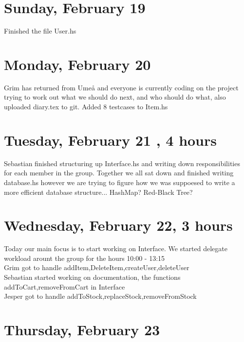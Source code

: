\documentclass[11pt]{article}
\begin{document}
\section*{Sunday, February 19}
Finished the file User.hs
\section*{Monday, February 20}
Grim has returned from Umeå and everyone is currently coding on the project trying to work out what we should do next, and who should do what, also uploaded diary.tex to git. Added 8 testcases to Item.hs
\section*{Tuesday, February 21 , 4 hours }
Sebastian finished structuring up Interface.hs and writing down responsibilities for each member in the group.
Together we all sat down and finished writing database.hs however we are trying to figure how we was suppoesed to write a more efficient database structure... HashMap? Red-Black Tree?
\section*{Wednesday, February 22, 3 hours }
Today our main focus is to start working on Interface. We started delegate workload arount the group for the hours 10:00 - 13:15 \\
Grim got to handle addItem,DeleteItem,createUser,deleteUser \\
Sebastian started working on documentation, the functions addToCart,removeFromCart in Interface \\
Jesper got to handle addToStock,replaceStock,removeFromStock \\
\section*{Thursday, February 23}
\end{document}
